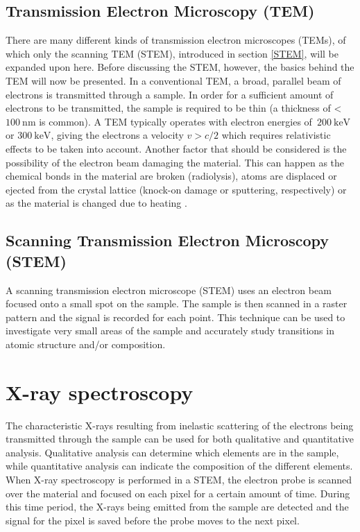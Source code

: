 	\subsection{Transmission Electron Microscopy (TEM)}
There are many different kinds of transmission electron microscopes (TEMs), of which only the scanning TEM (STEM), introduced in section \ref{STEM}, will be expanded upon here. Before discussing the STEM, however, the basics behind the TEM will now be presented. In a conventional TEM, a broad, parallel beam of electrons is transmitted through a sample. In order for a sufficient amount of electrons to be transmitted, the sample is required to be thin (a thickness of <$\SI{100}{\nano\meter}$ is common). A TEM typically operates with electron energies of $\SI{200}{\kilo\electronvolt}$ or $\SI{300}{\kilo\electronvolt}$, giving the electrons a velocity $v > c/2$ which requires relativistic effects to be taken into account. Another factor that should be considered is the possibility of the electron beam damaging the material. This can happen as the chemical bonds in the material are broken (radiolysis), atoms are displaced or ejected from the crystal lattice (knock-on damage or sputtering, respectively) or as the material is changed due to heating \cite{williams-carter}.

	\subsection{Scanning Transmission Electron Microscopy (STEM)}
A scanning transmission electron microscope (STEM) uses an electron beam focused onto a small spot on the sample. The sample is then scanned in a raster pattern and the signal is recorded for each point. This technique can be used to investigate very small areas of the sample and accurately study transitions in atomic structure and/or composition.

\section{X-ray spectroscopy}\label{EDS}
The characteristic X-rays resulting from inelastic scattering of the electrons being transmitted through the sample can be used for both qualitative and quantitative analysis. Qualitative analysis can determine which elements are in the sample, while quantitative analysis can indicate the composition of the different elements. When X-ray spectroscopy is performed in a STEM, the electron probe is scanned over the material and focused on each pixel for a certain amount of time. During this time period, the X-rays being emitted from the sample are detected and the signal for the pixel is saved before the probe moves to the next pixel. 

